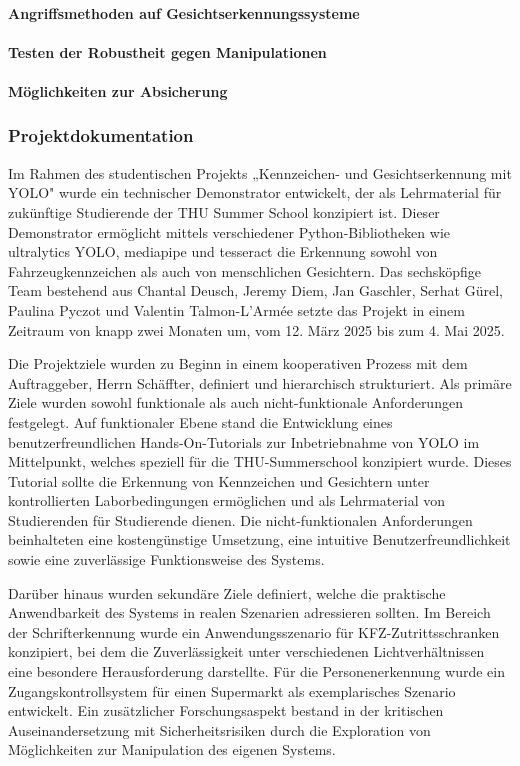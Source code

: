 \paragraph{Angriffsmethoden auf Gesichtserkennungssysteme}
\paragraph{Testen der Robustheit gegen Manipulationen}
\paragraph{Möglichkeiten zur Absicherung}

\subsubsection{Projektdokumentation}

Im Rahmen des studentischen Projekts „Kennzeichen- und Gesichtserkennung mit YOLO" wurde ein technischer Demonstrator entwickelt, der als Lehrmaterial für zukünftige Studierende der THU Summer School konzipiert ist. Dieser Demonstrator ermöglicht mittels verschiedener Python-Bibliotheken wie ultralytics YOLO, mediapipe und tesseract die Erkennung sowohl von Fahrzeugkennzeichen als auch von menschlichen Gesichtern. Das sechsköpfige Team bestehend aus Chantal Deusch, Jeremy Diem, Jan Gaschler, Serhat Gürel, Paulina Pyczot und Valentin Talmon-L'Armée setzte das Projekt in einem Zeitraum von knapp zwei Monaten um, vom 12. März 2025 bis zum 4. Mai 2025.

Die Projektziele wurden zu Beginn in einem kooperativen Prozess mit dem Auftraggeber, Herrn Schäffter, definiert und hierarchisch strukturiert. Als primäre Ziele wurden sowohl funktionale als auch nicht-funktionale Anforderungen festgelegt. Auf funktionaler Ebene stand die Entwicklung eines benutzerfreundlichen Hands-On-Tutorials zur Inbetriebnahme von YOLO im Mittelpunkt, welches speziell für die THU-Summerschool konzipiert wurde. Dieses Tutorial sollte die Erkennung von Kennzeichen und Gesichtern unter kontrollierten Laborbedingungen ermöglichen und als Lehrmaterial von Studierenden für Studierende dienen. Die nicht-funktionalen Anforderungen beinhalteten eine kostengünstige Umsetzung, eine intuitive Benutzerfreundlichkeit sowie eine zuverlässige Funktionsweise des Systems.

Darüber hinaus wurden sekundäre Ziele definiert, welche die praktische Anwendbarkeit des Systems in realen Szenarien adressieren sollten. Im Bereich der Schrifterkennung wurde ein Anwendungsszenario für KFZ-Zutrittsschranken konzipiert, bei dem die Zuverlässigkeit unter verschiedenen Lichtverhältnissen eine besondere Herausforderung darstellte. Für die Personenerkennung wurde ein Zugangskontrollsystem für einen Supermarkt als exemplarisches Szenario entwickelt. Ein zusätzlicher Forschungsaspekt bestand in der kritischen Auseinandersetzung mit Sicherheitsrisiken durch die Exploration von Möglichkeiten zur Manipulation des eigenen Systems.

